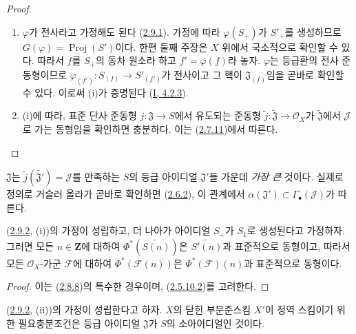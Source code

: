 \begin{proof}
\begin{enumerate}
  \item[\rm(i)] $\varphi$가 전사라고 가정해도 된다
    (\hyperref[II.2.9.1-ko]{2.9.1}). 가정에 따라 $\varphi(S_+)$가
    $S'_+$를 생성하므로 $G(\varphi)=\operatorname{Proj}(S')$이다.
    한편 둘째 주장은 $X$ 위에서 국소적으로 확인할 수 있다. 따라서
    $f$를 $S_+$의 동차 원소라 하고 $f'=\varphi(f)$라 놓자.
    $\varphi$는 등급환의 전사 준동형이므로
    $\varphi_{(f')}:S_{(f)}\to S'_{(f')}$가 전사이고 그 핵이
    $\mathfrak{J}_{(f)}$임을 곧바로 확인할 수 있다. 이로써 (i)가
    증명된다 (\hyperref[I.4.2.3-ko]{I, 4.2.3}).
  \item[\rm(ii)] (i)에 따라, 표준 단사 준동형
    $j:\mathfrak{J}\to S$에서 유도되는 준동형
    $\widetilde{j}:\widetilde{\mathfrak{J}}\to\mathcal{O}_X$가
    $\widetilde{\mathfrak{J}}$에서 $\mathcal{J}$로 가는 동형임을
    확인하면 충분하다. 이는 (\hyperref[II.2.7.11-ko]{2.7.11})에서
    따른다.
\end{enumerate}
\end{proof}

$\mathfrak{J}$는
$\widetilde{j}(\widetilde{\mathfrak{J}'})=\mathcal{J}$를 만족하는
$S$의 등급 아이디얼 $\mathfrak{J}'$들 가운데 \emph{가장 큰} 것이다.
실제로 정의로 거슬러 올라가 곧바로 확인하면
(\hyperref[II.2.6.2-ko]{2.6.2}), 이 관계에서
$\alpha(\mathfrak{J}')\subset\Gamma_\bullet(\mathcal{J})$가 따른다.

\begin{corollary}[2.9.3]
\label{II.2.9.3-ko}
(\hyperref[II.2.9.2-ko]{2.9.2}, (i))의 가정이 성립하고, 더 나아가
아이디얼 $S_+$가 $S_1$로 생성된다고 가정하자. 그러면 모든
$n\in\mathbf{Z}$에 대하여 $\Phi^*(\widetilde{S(n)})$은
$\widetilde{S'(n)}$과 표준적으로 동형이고, 따라서 모든
$\mathcal{O}_X$-가군 $\mathcal{F}$에 대하여
$\Phi^*(\mathcal{F}(n))$은 $\Phi^*(\mathcal{F})(n)$과 표준적으로
동형이다.
\end{corollary}

\begin{proof}
이는 (\hyperref[II.2.8.8-ko]{2.8.8})의 특수한 경우이며,
(\hyperref[II.2.5.10.2-ko]{2.5.10.2})를 고려한다.
\end{proof}

\begin{corollary}[2.9.4]
\label{II.2.9.4-ko}
(\hyperref[II.2.9.2-ko]{2.9.2}, (ii))의 가정이 성립한다고 하자.
$X$의 닫힌 부분준스킴 $X'$이 정역 스킴이기 위한 필요충분조건은 등급
아이디얼 $\mathfrak{J}$가 $S$의 소아이디얼인 것이다.
\end{corollary}

